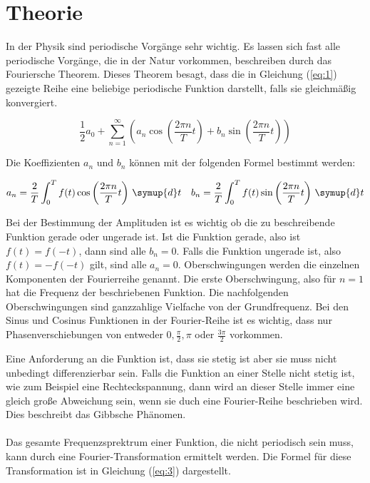 \section{Theorie}

In der Physik sind periodische Vorgänge sehr wichtig. Es lassen sich fast alle
periodische Vorgänge, die in der Natur vorkommen, beschreiben durch das Fouriersche
Theorem. Dieses Theorem besagt, dass die in Gleichung (\ref{eq:1}) gezeigte Reihe eine
beliebige periodische Funktion darstellt, falls sie gleichmäßig konvergiert.

\begin{equation}
  \frac{1}{2} a_0 + \sum^{\infty}_{n=1} \left( a_n \cos\left(\frac{2\pi n}{T} t\right) +
  b_n \sin\left(\frac{2\pi n}{T}t\right) \right)
  \label{eq:1}
\end{equation}

Die Koeffizienten $a_n$ und $b_n$ können mit der folgenden Formel bestimmt werden:

\begin{align}
  a_n = \frac{2}{T} \int_0^T f(t) \cos\left(\frac{2\pi n}{T} t\right) \, \symup{d}t &&
  b_n = \frac{2}{T} \int_0^T f(t) \sin\left(\frac{2\pi n}{T} t\right) \, \symup{d}t
  \label{eq:2}
\end{align}

Bei der Bestimmung der Amplituden ist es wichtig ob die zu beschreibende Funktion gerade oder
ungerade ist. Ist die Funktion gerade, also ist $f(t)=f(-t)$, dann sind alle $b_n=0$.
Falls die Funktion ungerade ist, also $f(t)=-f(-t)$ gilt, sind alle $a_n=0$.
Oberschwingungen werden die einzelnen Komponenten der Fourierreihe genannt. Die erste
Oberschwingung, also für $n=1$ hat die Frequenz der beschriebenen Funktion.
Die nachfolgenden Oberschwingungen sind ganzzahlige Vielfache von der Grundfrequenz.
Bei den Sinus und Cosinus Funktionen in der Fourier-Reihe ist es wichtig, dass nur
Phasenverschiebungen von entweder $0, \frac{\pi}{2}, \pi$ oder $\frac{3\pi}{2}$
vorkommen.

Eine Anforderung an die Funktion ist, dass sie stetig ist aber sie muss nicht unbedingt
differenzierbar sein. Falls die Funktion an einer Stelle nicht stetig ist, wie zum
Beispiel eine Rechteckspannung, dann wird an dieser Stelle immer eine gleich große Abweichung sein,
wenn sie duch eine Fourier-Reihe beschrieben wird. Dies beschreibt das Gibbsche Phänomen. \\\\

Das gesamte Frequenzsprektrum einer Funktion, die nicht periodisch sein muss, kann durch eine
Fourier-Transformation ermittelt werden. Die Formel für diese Transformation ist in
Gleichung (\ref{eq:3}) dargestellt.

